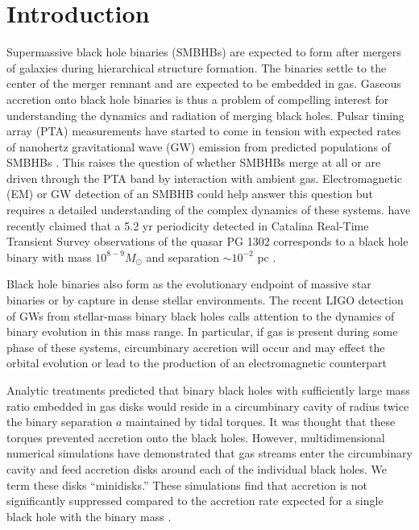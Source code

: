 
\section{Introduction} 


Supermassive black hole binaries (SMBHBs) are expected to form after mergers of galaxies during hierarchical structure formation.  The binaries settle to the center of the merger remnant and are expected to be embedded in gas. Gaseous accretion onto black hole binaries is thus a problem of compelling interest for understanding the dynamics and radiation of merging black holes. Pulsar timing array (PTA) measurements have started to come in tension with expected rates of nanohertz gravitational wave (GW) emission from predicted populations of SMBHBs \citep{Shannon15}. This raises the question of whether SMBHBs merge at all or are driven through the PTA band by interaction with ambient gas. Electromagnetic (EM) or GW detection of an SMBHB could help answer this question but requires a detailed understanding of the complex dynamics of these systems. \cite{Graham15A} have recently claimed that a 5.2 yr periodicity detected in Catalina Real-Time Transient Survey observations of the quasar PG 1302 corresponds to a black hole binary with mass $10^{8-9}M_{\odot}$ and separation $\sim 10^{-2}$ pc \citep[see also][]{Graham15B}. 

Black hole binaries also form as the evolutionary endpoint of massive star binaries or by capture in dense stellar environments. The recent LIGO detection of GWs from stellar-mass binary black holes calls attention to the dynamics of binary evolution in this mass range. In particular, if gas is present during some phase of these systems, circumbinary accretion will occur and may effect the orbital evolution or lead to the production of an electromagnetic counterpart \citep{Bartos16, Perna16}

Analytic treatments \citep{Artymowicz94,Milos05,Shapiro10} predicted that binary black holes with sufficiently large mass ratio embedded in gas disks would reside in a circumbinary cavity of radius twice the binary separation $a$ maintained by tidal torques. It was thought that these torques prevented accretion onto the black holes. However, multidimensional numerical simulations \citep{MacFadyen08, Noble12, Farris12, DOrazio12,Gold14, Farris14, Farris15A, Farris15B,Shi15, Bankert15,Schnittman15,delValle15,Young15,DOrazio16, Munoz16,Miranda16} have demonstrated that gas streams enter the circumbinary cavity and feed accretion disks around each of the individual black holes. We term these disks ``minidisks.'' These simulations find that accretion is not significantly suppressed compared to the accretion rate expected for a single black hole with the binary mass \citep{Farris14,Shi15}.

